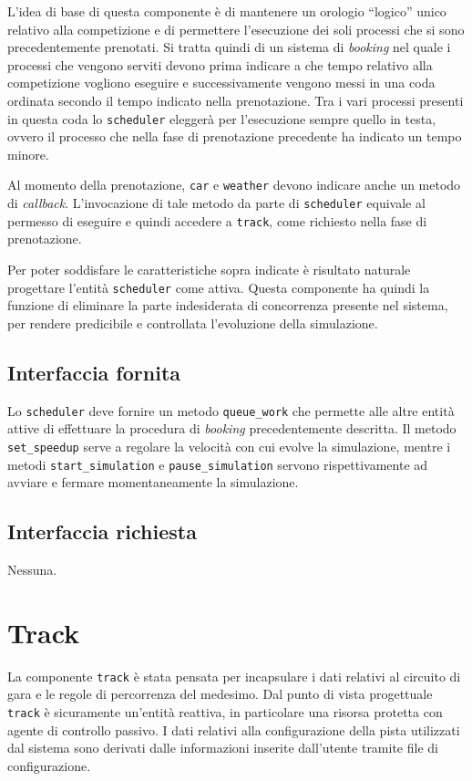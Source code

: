 \documentclass[a4paper]{report}
\newcommand{\fun}[1]{\texttt{#1}}
\begin{document}
L'idea di base di questa componente è di mantenere un orologio ``logico'' unico relativo alla competizione e di permettere l'esecuzione dei soli processi che si sono precedentemente prenotati. Si tratta quindi di un sistema di \textit{booking} nel quale i processi che vengono serviti devono prima indicare a che tempo relativo alla competizione vogliono eseguire e successivamente vengono messi in una coda ordinata secondo il tempo indicato nella prenotazione. Tra i vari processi presenti in questa coda lo \texttt{scheduler} eleggerà per l'esecuzione sempre quello in testa, ovvero il processo che nella fase di prenotazione precedente ha indicato un tempo minore.

Al momento della prenotazione, \texttt{car} e \texttt{weather} devono indicare anche un metodo di \textit{callback}. L'invocazione di tale metodo da parte di \texttt{scheduler} equivale al permesso di eseguire e quindi accedere a \texttt{track}, come richiesto nella fase di prenotazione.

Per poter soddisfare le caratteristiche sopra indicate è risultato naturale progettare l'entità \texttt{scheduler} come attiva.
Questa componente ha quindi la funzione di eliminare la parte indesiderata di concorrenza presente nel sistema, per rendere predicibile e controllata l'evoluzione della simulazione.

\subsection*{Interfaccia fornita}
Lo \texttt{scheduler} deve fornire un metodo \fun{queue\_work} che permette alle altre entità attive di effettuare la procedura di \textit{booking} precedentemente descritta.
Il metodo \fun{set\_speedup} serve a regolare la velocità con cui evolve la simulazione, mentre i metodi \fun{start\_simulation} e \fun{pause\_simulation} servono rispettivamente ad avviare e fermare momentaneamente la simulazione.

\subsection*{Interfaccia richiesta}
Nessuna.

\section{Track}
La componente \texttt{track} è stata pensata per incapsulare i dati relativi al circuito di gara e le regole di percorrenza del medesimo. Dal punto di vista progettuale \texttt{track} è sicuramente un'entità reattiva, in particolare una risorsa protetta con agente di controllo passivo.
I dati relativi alla configurazione della pista utilizzati dal sistema sono derivati dalle informazioni inserite dall'utente tramite file di configurazione.
\end{document}
